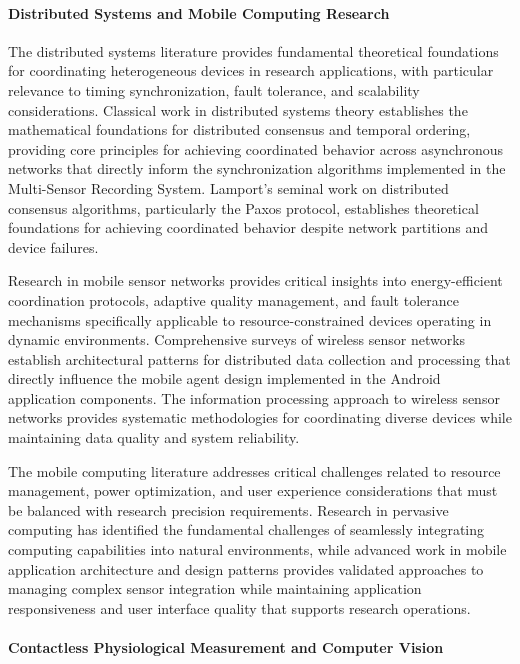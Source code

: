 \documentclass[12pt,a4paper]{report}
\begin{document}
\paragraph{Distributed Systems and Mobile Computing Research}

The distributed systems literature provides fundamental theoretical foundations for coordinating heterogeneous devices
in research applications, with particular relevance to timing synchronization, fault tolerance, and scalability
considerations. Classical work in distributed systems theory establishes the mathematical foundations for distributed
consensus and temporal ordering, providing core principles for achieving coordinated behavior across asynchronous
networks that directly inform the synchronization algorithms implemented in the Multi-Sensor Recording System. Lamport's
seminal work on distributed consensus algorithms, particularly the Paxos protocol, establishes theoretical foundations
for achieving coordinated behavior despite network partitions and device failures.

Research in mobile sensor networks provides critical insights into energy-efficient coordination protocols, adaptive
quality management, and fault tolerance mechanisms specifically applicable to resource-constrained devices operating in
dynamic environments. Comprehensive surveys of wireless sensor networks establish architectural patterns for distributed
data collection and processing that directly influence the mobile agent design implemented in the Android application
components. The information processing approach to wireless sensor networks provides systematic methodologies for
coordinating diverse devices while maintaining data quality and system reliability.

The mobile computing literature addresses critical challenges related to resource management, power optimization, and
user experience considerations that must be balanced with research precision requirements. Research in pervasive
computing has identified the fundamental challenges of seamlessly integrating computing capabilities into natural
environments, while advanced work in mobile application architecture and design patterns provides validated approaches
to managing complex sensor integration while maintaining application responsiveness and user interface quality that
supports research operations.

\paragraph{Contactless Physiological Measurement and Computer Vision}
\end{document}

